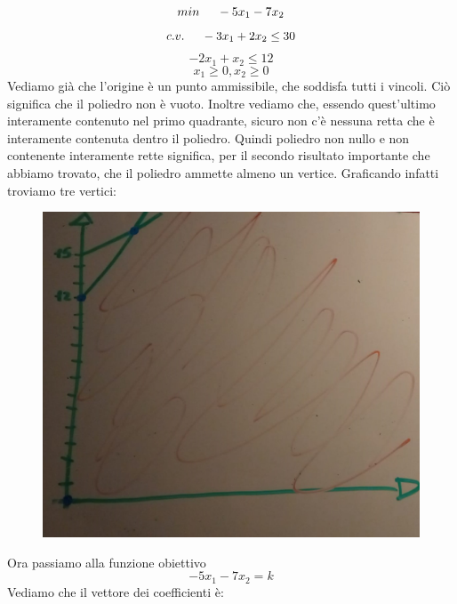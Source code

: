 \begin{equation*}
    min \hspace{0.5cm} -5x_1 -7x_2
\end{equation*}
\begin{equation*}
    c. v. \hspace{0.5cm} -3x_1 + 2x_2 \leq 30
\end{equation*}
\begin{equation*}
    -2x_1 + x_2 \leq 12
\end{equation*}
\begin{equation*}
    x_1 \geq 0, x_2 \geq 0
\end{equation*}
Vediamo già che l'origine è un punto ammissibile, che soddisfa tutti i vincoli. Ciò significa che il poliedro non è vuoto. Inoltre vediamo che, essendo quest'ultimo interamente contenuto nel primo quadrante, sicuro non c'è nessuna retta che è interamente contenuta dentro il poliedro. Quindi poliedro non nullo e non contenente interamente rette significa, per il secondo risultato importante che abbiamo trovato, che il poliedro ammette almeno un vertice. Graficando infatti troviamo tre vertici:
\begin{figure}[h!]
    \centering
    \includegraphics[scale=0.3]{WhatsAppImage2021-10-17at23.52.07.jpeg}
\end{figure}
Ora passiamo alla funzione obiettivo
\begin{equation*}
    -5x_1 -7x_2 = k
\end{equation*}
Vediamo che il vettore dei coefficienti è:
